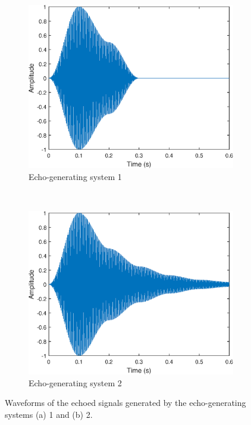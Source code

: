 \documentclass{article}
\begin{document}
\begin{figure}[h!]
	\centering
	\begin{subfigure}[h!]{0.5\textwidth}
		\includegraphics[width=\textwidth]{figs/hw01q2_echoed1.eps}
		\caption{Echo-generating system 1}
	\end{subfigure}%
	~ %
	\begin{subfigure}[h!]{0.5\textwidth}
		\includegraphics[width=\textwidth]{figs/hw01q2_echoed2.eps}
		\caption{Echo-generating system 2}
	\end{subfigure}
	\caption{Waveforms of the echoed signals generated by the echo-generating systems (a) 1 and (b) 2.}
\end{figure}
\end{document}
